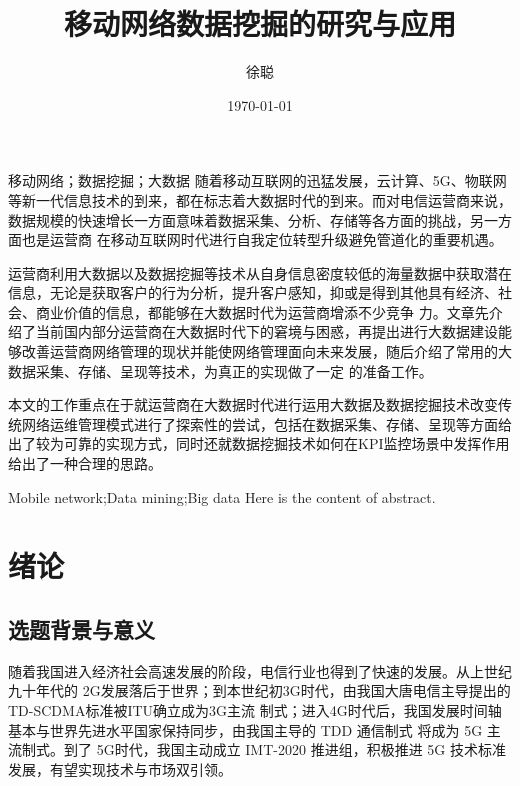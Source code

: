 \documentclass{HustGraduPaper}
\title{移动网络数据挖掘的研究与应用}
\author{徐聪}
\date{\today}
\begin{document}
    \maketitle
    \statement
    \clearpage

    \begin{cnabstract}{移动网络；数据挖掘；大数据}
        随着移动互联网的迅猛发展，云计算、5G、物联网等新一代信息技术的到来，都在标志着大数据时代的到来。而对电信运营商来说，数据规模的快速增长一方面意味着数据采集、分析、存储等各方面的挑战，另一方面也是运营商
        在移动互联网时代进行自我定位转型升级避免管道化的重要机遇。

        运营商利用大数据以及数据挖掘等技术从自身信息密度较低的海量数据中获取潜在信息，无论是获取客户的行为分析，提升客户感知，抑或是得到其他具有经济、社会、商业价值的信息，都能够在大数据时代为运营商增添不少竞争
        力。文章先介绍了当前国内部分运营商在大数据时代下的窘境与困惑，再提出进行大数据建设能够改善运营商网络管理的现状并能使网络管理面向未来发展，随后介绍了常用的大数据采集、存储、呈现等技术，为真正的实现做了一定
        的准备工作。
        
        本文的工作重点在于就运营商在大数据时代进行运用大数据及数据挖掘技术改变传统网络运维管理模式进行了探索性的尝试，包括在数据采集、存储、呈现等方面给出了较为可靠的实现方式，同时还就数据挖掘技术如何在KPI监控场景中发挥作用
        给出了一种合理的思路。


    \end{cnabstract}
    \begin{enabstract}{Mobile network;Data mining;Big data}
        Here is the content of abstract.
    \end{enabstract}

    \tableofcontents
    \clearpage

    \section{绪论}
    
    \subsection{选题背景与意义}

    随着我国进入经济社会高速发展的阶段，电信行业也得到了快速的发展。从上世纪九十年代的
    2G发展落后于世界；到本世纪初3G时代，由我国大唐电信主导提出的TD-SCDMA标准被ITU确立成为3G主流
    制式；进入4G时代后，我国发展时间轴基本与世界先进水平国家保持同步，由我国主导的 TDD 通信制式
    将成为 5G 主流制式。到了 5G时代，我国主动成立 IMT-2020 推进组，积极推进 5G 技术标准发展，有望实现技术与市场双引领。
    
\end{document}
